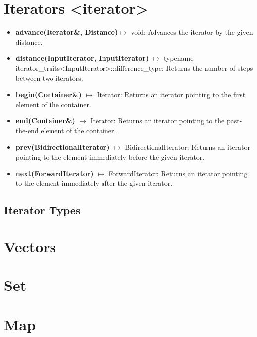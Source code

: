 \documentclass{report}
\begin{document}
    \pagebreak \bigbreak \noindent
    \section{\LARGE Iterators <iterator>}
    \bigbreak \noindent 
    \begin{itemize}
        \item \textbf{advance(Iterator\&, Distance)}$\mapsto$ void: Advances the iterator by the given distance.
        \item \textbf{distance(InputIterator, InputIterator)} \(\mapsto\) typename iterator\_traits<InputIterator>::difference\_type: Returns the number of steps between two iterators.
        \item \textbf{begin(Container\&)} \(\mapsto\) Iterator: Returns an iterator pointing to the first element of the container.
        \item \textbf{end(Container\&)} \(\mapsto\) Iterator: Returns an iterator pointing to the past-the-end element of the container.
        \item \textbf{prev(BidirectionalIterator)} \(\mapsto\) BidirectionalIterator: Returns an iterator pointing to the element immediately before the given iterator.
        \item \textbf{next(ForwardIterator)} \(\mapsto\) ForwardIterator: Returns an iterator pointing to the element immediately after the given iterator.
    \end{itemize}

    \bigbreak \noindent 
    \subsection{Iterator Types}
    \bigbreak \noindent 

    

    \pagebreak \bigbreak \noindent 
    \section{\LARGE Vectors}
    \bigbreak \noindent 

    \pagebreak \bigbreak \noindent 
    \section{\LARGE Set}
    \bigbreak \noindent 

    \pagebreak \bigbreak \noindent 
    \section{\LARGE Map}
    \bigbreak \noindent 




%
%
%     

%
%
%

    
\end{document}
